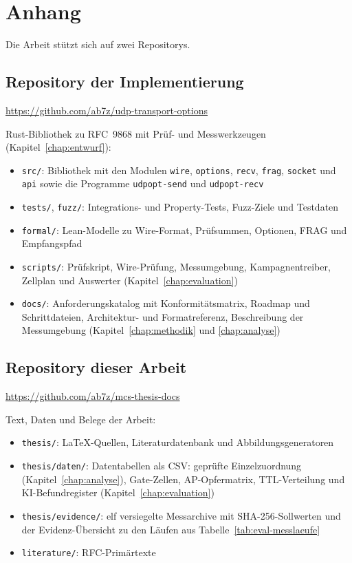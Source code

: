 \documentclass[
    12pt,           %
    a4paper,        %
    oneside,        %
    openany         %
]{report}
\newcommand{\file}[1]{\texttt{#1}}
\newcommand{\chapref}[1]{Kapitel~\ref{#1}}
\newcommand{\tabref}[1]{Tabelle~\ref{#1}}
\begin{document}

\chapter*{Anhang}

Die Arbeit stützt sich auf zwei Repositorys.

\section*{Repository der Implementierung}

\url{https://github.com/ab7z/udp-transport-options}

\noindent
Rust-Bibliothek zu RFC~9868 mit Prüf- und Messwerkzeugen (\chapref{chap:entwurf}):
\begin{itemize}[leftmargin=1.6em]
    \item \file{src/}: Bibliothek mit den Modulen \texttt{wire}, \texttt{options}, \texttt{recv}, \texttt{frag},
        \texttt{socket} und \texttt{api} sowie die Programme \texttt{udpopt-send} und \texttt{udpopt-recv}
    \item \file{tests/}, \file{fuzz/}: Integrations- und Property-Tests, Fuzz-Ziele und Testdaten
    \item \file{formal/}: Lean-Modelle zu Wire-Format, Prüfsummen, Optionen, FRAG und Empfangspfad
    \item \file{scripts/}: Prüfskript, Wire-Prüfung, Messumgebung, Kampagnentreiber, Zellplan und Auswerter
        (\chapref{chap:evaluation})
    \item \file{docs/}: Anforderungskatalog mit Konformitätsmatrix, Roadmap und Schritt\-dateien, Architektur- und
        Formatreferenz, Beschreibung der Messumgebung (Kapitel~\ref{chap:methodik} und \ref{chap:analyse})
\end{itemize}

\section*{Repository dieser Arbeit}

\url{https://github.com/ab7z/mcs-thesis-docs}

\noindent
Text, Daten und Belege der Arbeit:
\begin{itemize}[leftmargin=1.6em]
    \item \file{thesis/}: LaTeX-Quellen, Literaturdatenbank und Abbildungsgeneratoren
    \item \file{thesis/daten/}: Datentabellen als CSV: geprüfte Einzelzuordnung (\chapref{chap:analyse}),
        Gate-Zellen, AP-Opfermatrix, TTL-Verteilung und KI-Befundregister (\chapref{chap:evaluation})
    \item \file{thesis/evidence/}: elf versiegelte Messarchive mit SHA-256-Sollwerten und der Evidenz-Übersicht
        zu den Läufen aus \tabref{tab:eval-messlaeufe}
    \item \file{literature/}: RFC-Primärtexte
\end{itemize}
\end{document}
